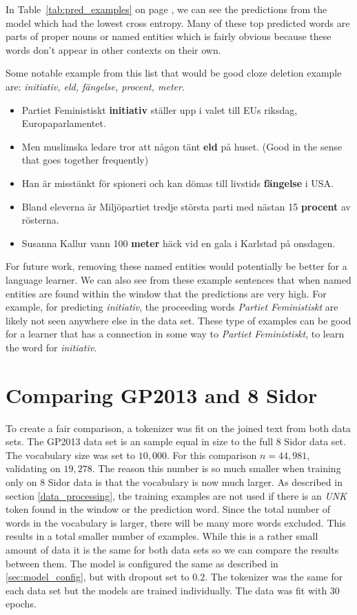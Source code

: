 \documentclass[11pt,a4paper]{article}
\begin{document}
In Table~\ref{tab:pred_examples} on page \pageref{tab:pred_examples}, we can see the predictions from the model which had the lowest cross entropy.
Many of these top predicted words are parts of proper nouns or named entities which is fairly obvious because these words don't appear in other contexts on their own.

Some notable example from this list that would be good cloze deletion example are: \textit{initiativ, eld, fängelse, procent, meter}.
\begin{itemize}
    \item Partiet Feministiskt \textbf{initiativ} ställer upp i valet till EUs riksdag, Europaparlamentet.
    \item Men muslimska ledare tror att någon tänt \textbf{eld} på huset. (Good in the sense that  goes together frequently)
    \item Han är misstänkt för spioneri och kan dömas till livstids \textbf{fängelse} i USA.
    \item Bland eleverna är Miljöpartiet tredje största parti med nästan 15 \textbf{procent} av rösterna.
    \item Susanna Kallur vann 100 \textbf{meter} häck vid en gala i Karlstad på onsdagen.
\end{itemize}

For future work, removing these named entities would potentially be better for a language learner.
We can also see from these example sentences that when named entities are found within the window that the predictions are very high.
For example, for predicting \textit{initiativ}, the proceeding words \textit{Partiet Feministiskt} are likely not seen anywhere else in the data set.
These type of examples can be good for a learner that has a connection in some way to \textit{Partiet Feministiskt}, to learn the word for \textit{initiativ}. 
\section{Comparing GP2013 and 8 Sidor}
To create a fair comparison, a tokenizer was fit on the joined text from both data sets.
The GP2013 data set is an sample equal in size to the full 8 Sidor data set.
The vocabulary size was set to $10,000$.
For this comparison $n = 44,981$, validating on $19,278$.
The reason this number is so much smaller when training only on 8 Sidor data is that the vocabulary is now much larger.
As described in section \ref{data_processing}, the training examples are not used if there is an \textit{UNK} token found in the window or the prediction word.
Since the total number of words in the vocabulary is larger, there will be many more words excluded.
This results in a total smaller number of examples.
While this is a rather small amount of data it is the same for both data sets so we can compare the results between them.
The model is configured the same as described in \ref{sec:model_config}, but with dropout set to $0.2$.
The tokenizer was the same for each data set but the models are trained individually.
The data was fit with 30 epochs.
\end{document}
